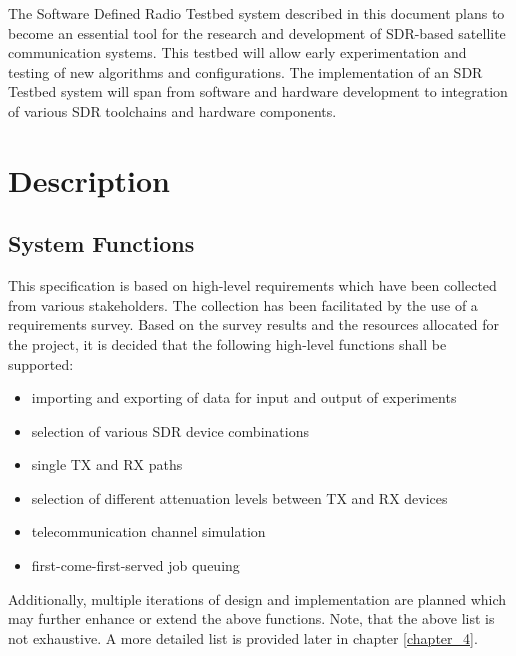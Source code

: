 \documentclass[english,titlepage,a4paper]{report}
\begin{document}
The Software Defined Radio Testbed system described in this document plans to become an essential tool for the research and development of SDR-based satellite communication systems.
This testbed will allow early experimentation and testing of new algorithms and configurations.
The implementation of an SDR Testbed system will span from software and hardware development to integration of various SDR toolchains and hardware components.

\printglossary[type=references,numberedsection,style=references,nonumberlist]

\chapter{Description}
\section{System Functions}

This specification is based on high-level requirements which have been collected from various stakeholders.
The collection has been facilitated by the use of a requirements survey.
Based on the survey results and the resources allocated for the project, it is decided that the following high-level functions shall be supported:
\begin{itemize}
\item importing and exporting of data for input and output of experiments
\item selection of various SDR device combinations
\item single TX and RX paths
\item selection of different attenuation levels between TX and RX devices
\item telecommunication channel simulation
\item first-come-first-served job queuing
\end{itemize}

Additionally, multiple iterations of design and implementation are planned which may further enhance or extend the above functions.
Note, that the above list is not exhaustive.
A more detailed list is provided later in chapter \ref{chapter_4}.
\end{document}

